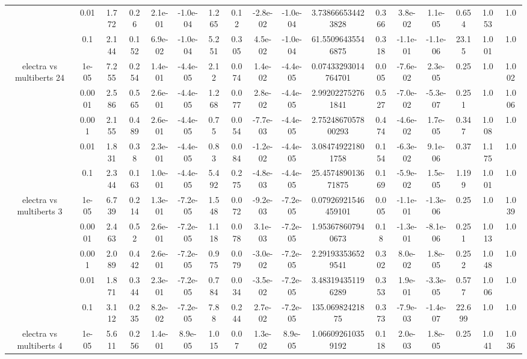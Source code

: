 \begin{tabular}{|c|c|c|c|c|c|c|c|c|c|c|c|c|c|c|c|c|}
 & 0.01 & 1.772 & 0.26 & 2.1e-01 & -1.0e-04 & 1.265 & 0.12 & -2.8e-02 & -1.0e-04 & 3.738666534423828 & 0.366 & 3.8e-02 & 1.1e-05 & 0.654 & 1.053 & 1.0 \\
 & 0.1 & 2.144 & 0.152 & 6.9e-02 & -1.0e-04 & 5.251 & 0.305 & 4.5e-02 & -1.0e-04 & 61.55096435546875 & 0.318 & -1.1e-01 & -1.1e-06 & 23.15 & 1.001 & 1.0 \\
\hline
\multirow{5}{*}{electra  vs multiberts 24} & 1e-05 & 7.255 & 0.254 & 1.4e-01 & -4.4e-05 & 2.12 & 0.074 & 1.4e-02 & -4.4e-05 & 0.07433293014764701 & 0.005 & -7.6e-02 & 2.3e-05 & 0.25 & 1.0 & 1.002 \\
 & 0.0001 & 2.586 & 0.565 & 2.6e-01 & -4.4e-05 & 1.268 & 0.077 & 2.8e-02 & -4.4e-05 & 2.992022752761841 & 0.527 & -7.0e-02 & -5.3e-07 & 0.251 & 1.0 & 1.006 \\
 & 0.001 & 2.155 & 0.489 & 2.6e-01 & -4.4e-05 & 0.75 & 0.054 & -7.7e-03 & -4.4e-05 & 2.7524867057800293 & 0.474 & -4.6e-02 & 1.7e-05 & 0.347 & 1.008 & 1.0 \\
 & 0.01 & 1.831 & 0.38 & 2.3e-01 & -4.4e-05 & 0.83 & 0.084 & -1.2e-02 & -4.4e-05 & 3.084749221801758 & 0.154 & -6.3e-02 & 9.1e-06 & 0.37 & 1.175 & 1.0 \\
 & 0.1 & 2.344 & 0.163 & 1.0e-01 & -4.4e-05 & 5.492 & 0.275 & -4.8e-03 & -4.4e-05 & 25.457489013671875 & 0.169 & -5.9e-02 & 1.5e-05 & 1.199 & 1.001 & 1.0 \\
\hline
\multirow{5}{*}{electra  vs multiberts 3} & 1e-05 & 6.739 & 0.214 & 1.3e-01 & -7.2e-05 & 1.548 & 0.072 & -9.2e-03 & -7.2e-05 & 0.07926921546459101 & 0.005 & -1.1e-01 & -1.3e-06 & 0.25 & 1.0 & 1.039 \\
 & 0.0001 & 2.463 & 0.52 & 2.6e-01 & -7.2e-05 & 1.118 & 0.078 & 3.1e-03 & -7.2e-05 & 1.953678607940673 & 0.18 & -1.3e-01 & -8.1e-06 & 0.251 & 1.013 & 1.0 \\
 & 0.001 & 2.089 & 0.442 & 2.6e-01 & -7.2e-05 & 0.975 & 0.079 & -3.0e-02 & -7.2e-05 & 2.291933536529541 & 0.302 & 8.0e-02 & 1.8e-05 & 0.252 & 1.048 & 1.0 \\
 & 0.01 & 1.871 & 0.344 & 2.3e-01 & -7.2e-05 & 0.784 & 0.034 & -3.5e-02 & -7.2e-05 & 3.483194351196289 & 0.353 & 1.9e-01 & -3.3e-05 & 0.577 & 1.006 & 1.0 \\
 & 0.1 & 3.112 & 0.235 & 8.2e-02 & -7.2e-05 & 7.88 & 0.244 & 2.7e-02 & -7.2e-05 & 135.06982421875 & 0.373 & -7.9e-03 & -1.4e-07 & 22.699 & 1.0 & 1.0 \\
\hline
\multirow{5}{*}{electra  vs multiberts 4} & 1e-05 & 5.611 & 0.256 & 1.4e-01 & 8.9e-05 & 1.015 & 0.07 & 1.3e-02 & 8.9e-05 & 1.066092610359192 & 0.118 & 2.0e-03 & 1.8e-05 & 0.25 & 1.041 & 1.036 \\

\end{tabular}

